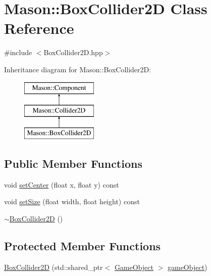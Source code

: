 \hypertarget{class_mason_1_1_box_collider2_d}{}\section{Mason\+:\+:Box\+Collider2D Class Reference}
\label{class_mason_1_1_box_collider2_d}


{\ttfamily \#include $<$Box\+Collider2\+D.\+hpp$>$}

Inheritance diagram for Mason\+:\+:Box\+Collider2D\+:\begin{figure}[H]
\begin{center}
\leavevmode
\includegraphics[height=3.000000cm]{class_mason_1_1_box_collider2_d}
\end{center}
\end{figure}
\subsection*{Public Member Functions}
\begin{DoxyCompactItemize}
\item 
void \hyperlink{class_mason_1_1_box_collider2_d_a4be834b1d746af44174f75e1c92cbbbc}{set\+Center} (float x, float y) const
\item 
void \hyperlink{class_mason_1_1_box_collider2_d_a57e51f07f4e6baf8533c05268f8ee0ed}{set\+Size} (float width, float height) const
\item 
\hyperlink{class_mason_1_1_box_collider2_d_a623201cca71e261e893b9ffa795eb4a7}{$\sim$\+Box\+Collider2D} ()
\end{DoxyCompactItemize}
\subsection*{Protected Member Functions}
\begin{DoxyCompactItemize}
\item 
\hyperlink{class_mason_1_1_box_collider2_d_a5b81f4bc97912c6f8375a427819d6d68}{Box\+Collider2D} (std\+::shared\+\_\+ptr$<$ \hyperlink{class_mason_1_1_game_object}{Game\+Object} $>$ \hyperlink{class_mason_1_1_component_abaa67b569d0a70e26a4606f4a099a925}{game\+Object})
\end{DoxyCompactItemize}
